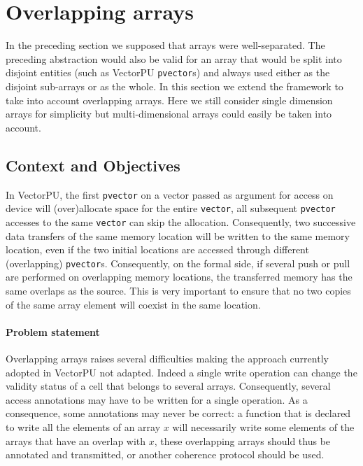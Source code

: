 \documentclass[preprint,12pt]{elsarticle}
\begin{document}
\section{Overlapping arrays}\label{sec:overlap-array}

In the preceding section we supposed that arrays were well-separated. The preceding abstraction would also be valid for an array that would be split into disjoint entities (such as
VectorPU \texttt{pvector}s) and always used either as the disjoint sub-arrays or as the whole. In this section we extend the framework to take into account overlapping arrays. Here we still consider single dimension arrays for simplicity but multi-dimensional arrays could easily be taken into account.

\subsection{Context and Objectives}

In VectorPU, the first \texttt{pvector} on a vector passed as argument for access on device will (over)allocate space for the entire \texttt{vector}, all subsequent \texttt{pvector} accesses to the same \texttt{vector} can skip the allocation.
 Consequently, two successive data transfers of the same memory location will be written to the same memory location, even if the two initial locations are accessed through different (overlapping) \texttt{pvector}s.
Consequently, on the formal side, if several push or pull are performed on overlapping memory locations, the transferred memory has the same overlaps as the source. This is very important to ensure that no two copies of the same array element will coexist in the same location.

\paragraph{Problem statement}
Overlapping arrays raises several difficulties making the approach currently adopted in VectorPU not adapted. Indeed a single write operation can change the validity status of a cell that belongs to several arrays. Consequently, several access annotations may have to be written for a single operation. As a consequence, some annotations may never be correct: a function that is declared to write all the elements of an array $x$ will necessarily write some elements of the arrays that have an overlap with $x$, these overlapping arrays should thus be annotated and transmitted, or another coherence protocol should be used.
\end{document}
